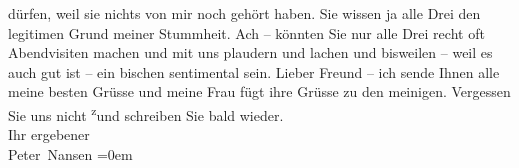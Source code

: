 \begin{ledgroupsized}[t]{13cm}
               dürfen, weil sie nichts von mir noch gehört haben. Sie wissen ja alle {\pb}Drei den legitimen Grund
               meiner Stummheit.\pend
           \pstart
           Ach – könnten Sie nur alle Drei recht oft \strikeout{\textcolor{gray}{ein}} Abendvisiten machen und mit uns plaudern und lachen und bisweilen – weil es
               auch gut ist – ein bischen sentimental sein.\pend
           \pstart
           Lieber Freund – ich sende Ihnen alle meine besten Grüsse und meine Frau fügt ihre Grüsse zu den meinigen.\pend
           \pstart
           Vergessen Sie uns nicht \substVorne{}\textsuperscript{z}\substDazwischen{}u\substHinten{}nd schreiben Sie bald wieder.{\\[\baselineskip]} Ihr ergebener{\\[\baselineskip]}\spacefill\mbox{Peter Nansen}\pend
           \leftskip=0em{}
         
         \endnumbering{}\end{ledgroupsized}  \newcommand{\dateiname}{L02786}\newcommand{\titel}{Paul Goldmann an Arthur Schnitzler, 26. 9. [1896]}\newcommand{\editorInnen}{Martin Anton Müller und Laura Untner}
      